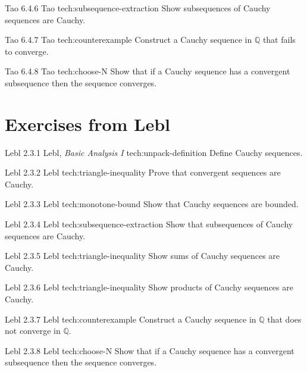 \cauchyex
{Tao 6.4.6}
{Tao}
{tech:subsequence-extraction}
{Show subsequences of Cauchy sequences are Cauchy.}

\cauchyex
{Tao 6.4.7}
{Tao}
{tech:counterexample}
{Construct a Cauchy sequence in $\mathbb{Q}$ that fails to converge.}

\cauchyex
{Tao 6.4.8}
{Tao}
{tech:choose-N}
{Show that if a Cauchy sequence has a convergent subsequence then the sequence converges.}


\section*{Exercises from Lebl}

\cauchyex
{Lebl 2.3.1}
{Lebl, \textit{Basic Analysis I}}
{tech:unpack-definition}
{Define Cauchy sequences.}

\cauchyex
{Lebl 2.3.2}
{Lebl}
{tech:triangle-inequality}
{Prove that convergent sequences are Cauchy.}

\cauchyex
{Lebl 2.3.3}
{Lebl}
{tech:monotone-bound}
{Show that Cauchy sequences are bounded.}

\cauchyex
{Lebl 2.3.4}
{Lebl}
{tech:subsequence-extraction}
{Show that subsequences of Cauchy sequences are Cauchy.}

\cauchyex
{Lebl 2.3.5}
{Lebl}
{tech:triangle-inequality}
{Show sums of Cauchy sequences are Cauchy.}

\cauchyex
{Lebl 2.3.6}
{Lebl}
{tech:triangle-inequality}
{Show products of Cauchy sequences are Cauchy.}

\cauchyex
{Lebl 2.3.7}
{Lebl}
{tech:counterexample}
{Construct a Cauchy sequence in $\mathbb{Q}$ that does not converge in $\mathbb{Q}$.}

\cauchyex
{Lebl 2.3.8}
{Lebl}
{tech:choose-N}
{Show that if a Cauchy sequence has a convergent subsequence then the sequence converges.}
